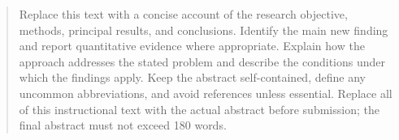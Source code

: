 \begin{abstract}
Replace this text with a concise account of the research objective,
methods, principal results, and conclusions. Identify the main new
finding and report quantitative evidence where appropriate. Explain how
the approach addresses the stated problem and describe the conditions
under which the findings apply. Keep the abstract self-contained, define
any uncommon abbreviations, and avoid references unless essential.
Replace all of this instructional text with the actual abstract before
submission; the final abstract must not exceed 180 words.
\end{abstract}
